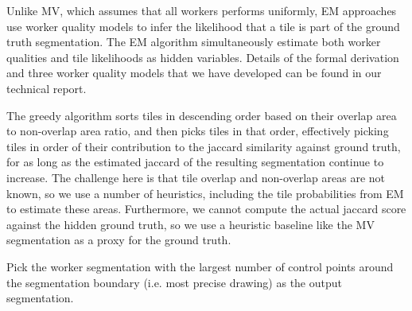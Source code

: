 \par \noindent Unlike MV, which assumes that all workers performs uniformly, EM approaches use worker quality models to infer the likelihood that a tile is part of the ground truth segmentation. The EM algorithm simultaneously estimate both worker qualities and tile likelihoods as hidden variables. Details of the formal derivation and three worker quality models that we have developed can be found in our technical report.

\par \noindent The greedy algorithm sorts tiles in descending order based on their overlap area to non-overlap area ratio, and then picks tiles in that order, effectively picking tiles in order of their contribution to the jaccard similarity against ground truth, for as long as the estimated jaccard of the resulting segmentation continue to increase.  The challenge here is that tile overlap and non-overlap areas are not known, so we use a number of heuristics, including the tile probabilities from EM to estimate these areas. Furthermore, we cannot compute the actual jaccard score against the hidden ground truth, so we use a heuristic baseline like the MV segmentation as a proxy for the ground truth.

\par \noindent Pick the worker segmentation with the largest number of control points around the segmentation boundary (i.e. most precise drawing) as the output segmentation.